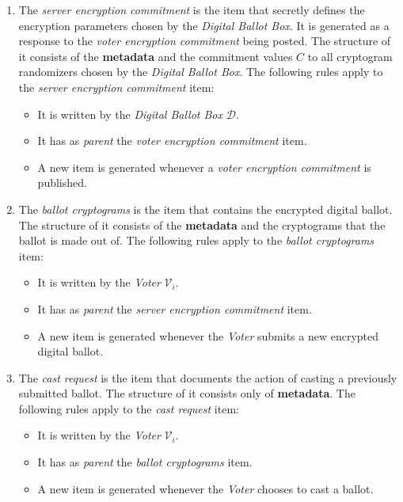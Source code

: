 \begin{enumerate}
    \item
        The \textit{server encryption commitment} is the item that secretly defines the encryption parameters chosen by the \textit{Digital Ballot Box}. It is generated as a response to the \textit{voter encryption commitment} being posted. The structure of it consists of the \textbf{metadata} and the commitment values $C$ to all cryptogram randomizers chosen by the \textit{Digital Ballot Box}. The following rules apply to the \textit{server encryption commitment} item:
        \begin{itemize}
            \item It is written by the \textit{Digital Ballot Box} $\mathcal{D}$.
            \item It has as \textit{parent} the \textit{voter encryption commitment} item.
            \item A new item is generated whenever a \textit{voter encryption commitment} is published.
        \end{itemize}
    
    \item
        The \textit{ballot cryptograms} is the item that contains the encrypted digital ballot. The structure of it consists of the \textbf{metadata} and the cryptograms that the ballot is made out of. The following rules apply to the \textit{ballot cryptograms} item:
        \begin{itemize}
            \item It is written by the \textit{Voter} $\mathcal{V}_i$.
            \item It has as \textit{parent} the \textit{server encryption commitment} item.
            \item A new item is generated whenever the \textit{Voter} submits a new encrypted digital ballot.
        \end{itemize}
    
    \item
        The \textit{cast request} is the item that documents the action of casting a previously submitted ballot. The structure of it consists only of \textbf{metadata}. The following rules apply to the \textit{cast request} item:
        \begin{itemize}
            \item It is written by the \textit{Voter} $\mathcal{V}_i$.
            \item It has as \textit{parent} the \textit{ballot cryptograms} item.
            \item A new item is generated whenever the \textit{Voter} chooses to cast a ballot.
        \end{itemize}
    

\end{enumerate}
